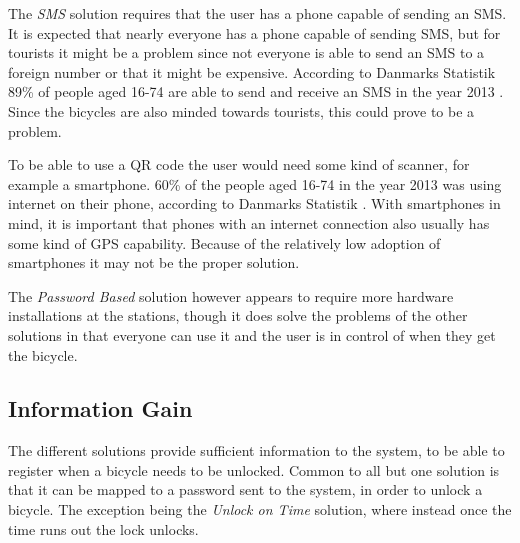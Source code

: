 The \textit{SMS} solution requires that the user has a phone capable of sending an SMS. 
It is expected that nearly everyone has a phone capable of sending SMS, but for tourists it might be a problem since not everyone is able to send an SMS to a foreign number or that it might be expensive.
According to Danmarks Statistik 89\% of people aged 16-74 are able to send and receive an SMS in the year 2013 \citep{misc:dstMobilephone}.
Since the bicycles are also minded towards tourists, this could prove to be a problem.

To be able to use a QR code the user would need some kind of scanner, for example a smartphone.
60\% of the people aged 16-74 in the year 2013 was using internet on their phone, according to Danmarks Statistik \citep{misc:dstMobilephone}.
With smartphones in mind, it is important that phones with an internet connection also usually has some kind of GPS capability.
Because of the relatively low adoption of smartphones it may not be the proper solution.

The \textit{Password Based} solution however appears to require more hardware installations at the stations, though it does solve the problems of the other solutions in that everyone can use it and the user is in control of when they get the bicycle.

\subsection{Information Gain}
The different solutions provide sufficient information to the system, to be able to register when a bicycle needs to be unlocked.
Common to all but one solution is that it can be mapped to a password sent to the system, in order to unlock a bicycle.
The exception being the \textit{Unlock on Time} solution, where instead once the time runs out the lock unlocks.